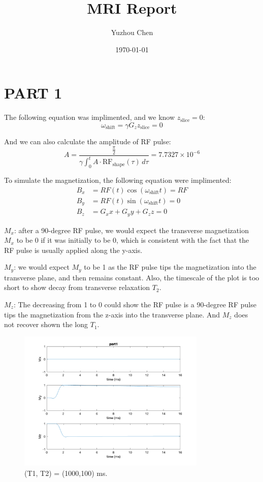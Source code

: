 \documentclass{report}
\title{MRI Report}
\author{Yuzhou Chen}
\date{\today}
\begin{document}
\maketitle
\section[short]{PART 1}
The following equation was implimented, and we know $z_{\text{slice}} = 0$:
\[
    \omega_{\text{shift}} = \gamma G_z z_{\text{slice}} = 0
\]

And we can also calculate the amplitude of RF pulse:
\[
A = \frac{\frac{\pi}{2}}{\gamma \int_{0}^{t} A \cdot \text{RF}_{\text{shape}}(\tau) \, d\tau} = 7.7327 \times 10^{-6}
\]

To simulate the magnetization, the following equation were implimented:
\begin{align*}
B_x &= RF(t) \cos(\omega_{\text{shift}} t) = RF\\
B_y &= RF(t) \sin(\omega_{\text{shift}} t) = 0\\
B_z &= G_{x} x + G_{y} y + G_{z} z = 0
\end{align*}

\textbf{$M_x$}: after a 90-degree RF pulse, we would expect the transverse magnetization 
$M_x$ to be 0 if it was initially to be 0, which is consistent with the fact that
 the RF pulse is usually applied along the y-axis.\vspace{\baselineskip}

\textbf{$M_y$}: we would expect $M_y$ to be 1  as the RF pulse tips the magnetization into
 the transverse plane, and then remains constant. Also, the timescale of the plot 
 is too short to show decay from transverse relaxation $T_2$.\vspace{\baselineskip}

\textbf{$M_z$}: The decreasing from 1 to 0 could show the RF pulse is a 90-degree RF pulse 
 tips the magnetization from the z-axis into the transverse plane. And $M_z$ does not
recover shown the long $T_1$.

\begin{figure}[hb]
    \centering
    \includegraphics[width=0.8\textwidth]{1.png}
    \caption{ (T1, T2) = (1000,100) ms.}
\end{figure}  
\newpage
\end{document}
